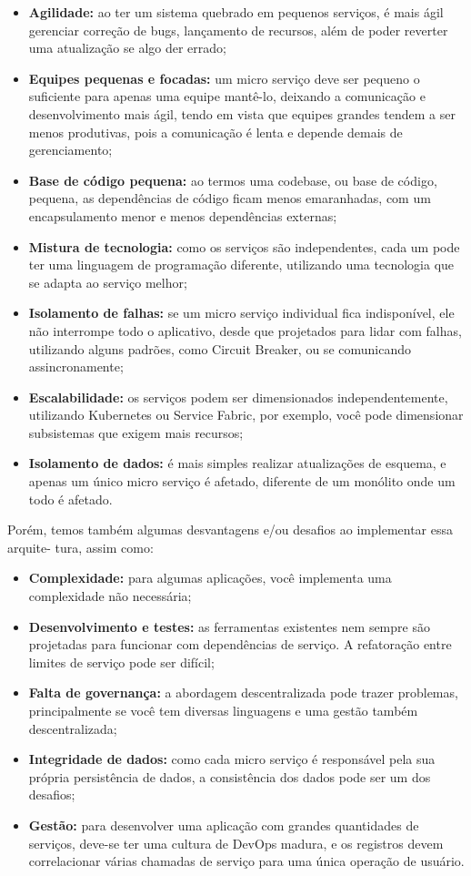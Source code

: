 \begin{itemize}
    \item \textbf{Agilidade:} ao ter um sistema quebrado em pequenos serviços, é mais ágil gerenciar correção de bugs, lançamento de recursos, além de poder reverter uma atualização se algo der errado;
    \item \textbf{Equipes pequenas e focadas:} um micro serviço deve ser pequeno o suficiente para apenas uma equipe mantê-lo, deixando a comunicação e desenvolvimento mais ágil, tendo em vista que equipes grandes tendem a ser menos produtivas, pois a comunicação é lenta e depende demais de gerenciamento;
    \item \textbf{Base de código pequena:} ao termos uma codebase, ou base de código, pequena, as dependências de código ficam menos emaranhadas, com um encapsulamento menor e menos dependências externas;
    \item \textbf{Mistura de tecnologia:} como os serviços são independentes, cada um pode ter uma linguagem de programação diferente, utilizando uma tecnologia que se adapta ao serviço melhor;
    \item \textbf{Isolamento de falhas:} se um micro serviço individual fica indisponível, ele não interrompe todo o aplicativo, desde que projetados para lidar com falhas, utilizando alguns padrões, como Circuit Breaker, ou se comunicando assincronamente;
    \item \textbf{Escalabilidade:} os serviços podem ser dimensionados independentemente, utilizando Kubernetes ou Service Fabric, por exemplo, você pode dimensionar subsistemas que exigem mais recursos;
    \item \textbf{Isolamento de dados:} é mais simples realizar atualizações de esquema, e apenas um único micro serviço é afetado, diferente de um monólito onde um todo é afetado.
\end{itemize}

Porém, temos também algumas desvantagens e/ou desafios ao implementar essa arquite-
tura, assim como:

\begin{itemize}
    \item \textbf{Complexidade:} para algumas aplicações, você implementa uma complexidade não necessária;
    \item \textbf{Desenvolvimento e testes:} as ferramentas existentes nem sempre são projetadas para funcionar com dependências de serviço. A refatoração entre limites de serviço pode ser difícil;
    \item \textbf{Falta de governança:} a abordagem descentralizada pode trazer problemas, principalmente se você tem diversas linguagens e uma gestão também descentralizada;
    \item \textbf{Integridade de dados:} como cada micro serviço é responsável pela sua própria persistência de dados, a consistência dos dados pode ser um dos desafios;
    \item \textbf{Gestão:} para desenvolver uma aplicação com grandes quantidades de serviços, deve-se ter uma cultura de DevOps madura, e os registros devem correlacionar várias chamadas de serviço para uma única operação de usuário.
\end{itemize}

